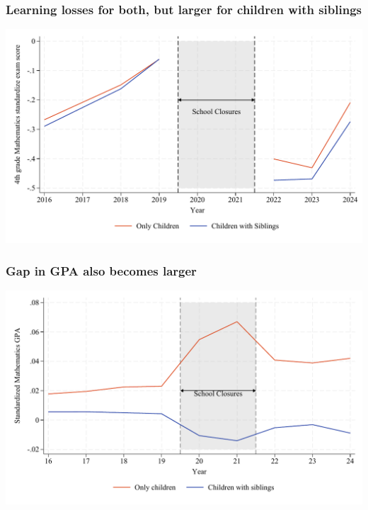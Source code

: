 \documentclass{beamer}
\begin{document}
\begin{frame}
    \label{frame:ece_trends}
    \frametitle{Learning losses for both, but larger for children with siblings}
               \includegraphics[width=\textwidth]{./FIGURES/Descriptive/raw_ece_math_4.pdf}    
    
\end{frame}

\begin{frame}
    \label{frame:gpa_trends}
    \frametitle{Gap in GPA also becomes larger}
               \includegraphics[width=\textwidth]{./FIGURES/Descriptive/raw_shade_total_elm_std_gpa_m_adj_Tsiblings_Sall_Size2_4.pdf}    
            \hyperlink{frame:gpa_trends_grades_elm}{}
  
\end{frame}
\end{document}

